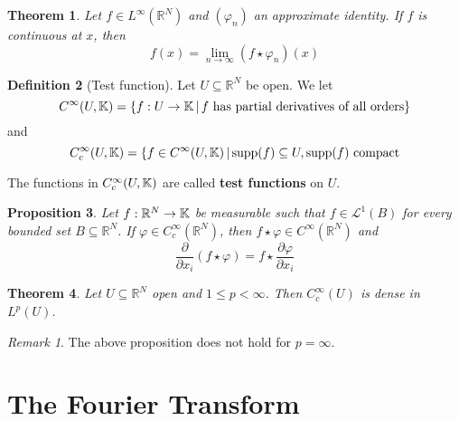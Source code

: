 \documentclass[10pt, oneside, reqno]{amsart}
\theoremstyle{plain}%
\newtheorem{thm}{Theorem}[section]
\newtheorem{prop}[thm]{Proposition}
\theoremstyle{definition}
\newtheorem{defn}[thm]{Definition}
\theoremstyle{remark}
\newtheorem*{rem}{Remark}
\newcommand{\R}{\mathbb{R}}
\renewcommand{\phi}{\varphi}
\begin{document}
\begin{thm}
	Let $f \in L^\infty(\R^N)$ and $(\phi_n)$ an approximate identity.  If $f$ is continuous at $x$, then \[
		f(x) = \lim_{n \rightarrow \infty} (f \star \phi_n) (x)
	\]
\end{thm}



\begin{defn}[Test function]
	Let $U \subseteq \R^N$ be open.  We let \[
		C^\infty (U, \mathbb{K}) = \{ f: U \rightarrow \mathbb{K} \, | \, f \text{ has partial derivatives of all orders} \}
	\]
	and \[
		C_c^\infty(U, \mathbb{K}) = \{ f \in C^\infty(U, \mathbb{K}) \, | \, \text{supp}(f) \subseteq U, \text{supp($f$) compact}
	\]
	
	The functions in $C_c^\infty(U, \mathbb{K})$ are called \textbf{test functions} on $U$.
\end{defn}

\begin{prop}
	Let $f : \R^N \rightarrow \K$ be measurable such that $f \in \mathcal{L}^1(B)$ for every bounded set $B \subseteq \R^N$.  If $\phi \in C_c^\infty(\R^N)$, then $f \star \phi \in C^\infty(\R^N)$ and \[
		\frac{\partial}{\partial x_i} (f \star \phi) = f \star \frac{\partial \phi}{\partial x_i}
	\]
\end{prop}

\begin{thm}
	Let $U \subseteq \R^N$ open and $1 \leq p < \infty$.  Then $C_c^\infty(U)$ is dense in $L^p(U)$.
\end{thm}
\begin{rem}
	The above proposition does not hold for $p = \infty$.
\end{rem}




















\renewcommand{\hat}{\widehat}

\section{The Fourier Transform} %
\label{sec:the_fourier_transform}
\end{document}
